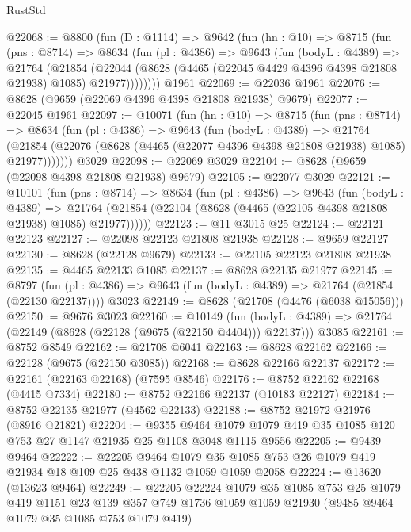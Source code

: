 \begin{lexlean}{RustStd}
\begin{coremodule}
@22068 := @8800
    (fun (D : @1114) =>
    @9642
      (fun (hn : @10) =>
      @8715
        (fun (pns : @8714) =>
        @8634
          (fun (pl : @4386) =>
          @9643
            (fun (bodyL : @4389) =>
            @21764
              (@21854
                (@22044 (@8628 (@4465 (@22045 @4429 @4396 @4398 @21808 @21938) @1085) @21977))))))))
    @1961
@22069 := @22036 @1961
@22076 := @8628 (@9659 (@22069 @4396 @4398 @21808 @21938) @9679)
@22077 := @22045 @1961
@22097 := @10071
    (fun (hn : @10) =>
    @8715
      (fun (pns : @8714) =>
      @8634
        (fun (pl : @4386) =>
        @9643
          (fun (bodyL : @4389) =>
          @21764
            (@21854 (@22076 (@8628 (@4465 (@22077 @4396 @4398 @21808 @21938) @1085) @21977)))))))
    @3029
@22098 := @22069 @3029
@22104 := @8628 (@9659 (@22098 @4398 @21808 @21938) @9679)
@22105 := @22077 @3029
@22121 := @10101
    (fun (pns : @8714) =>
    @8634
      (fun (pl : @4386) =>
      @9643
        (fun (bodyL : @4389) =>
        @21764 (@21854 (@22104 (@8628 (@4465 (@22105 @4398 @21808 @21938) @1085) @21977))))))
@22123 := @11 @3015 @25
@22124 := @22121 @22123
@22127 := @22098 @22123 @21808 @21938
@22128 := @9659 @22127
@22130 := @8628 (@22128 @9679)
@22133 := @22105 @22123 @21808 @21938
@22135 := @4465 @22133 @1085
@22137 := @8628 @22135 @21977
@22145 := @8797
    (fun (pl : @4386) => @9643 (fun (bodyL : @4389) => @21764 (@21854 (@22130 @22137))))
    @3023
@22149 := @8628 (@21708 (@4476 (@6038 @15056)))
@22150 := @9676 @3023
@22160 := @10149
    (fun (bodyL : @4389) => @21764 (@22149 (@8628 (@22128 (@9675 (@22150 @4404))) @22137)))
    @3085
@22161 := @8752 @8549
@22162 := @21708 @6041
@22163 := @8628 @22162
@22166 := @22128 (@9675 (@22150 @3085))
@22168 := @8628 @22166 @22137
@22172 := @22161 (@22163 @22168) (@7595 @8546)
@22176 := @8752 @22162 @22168 (@4415 @7334)
@22180 := @8752 @22166 @22137 (@10183 @22127)
@22184 := @8752 @22135 @21977 (@4562 @22133)
@22188 := @8752 @21972 @21976 (@8916 @21821)
@22204 := @9355
    @9464
    @1079
    @1079
    @419
    @35
    @1085
    @120
    @753
    @27
    @1147
    @21935
    @25
    @1108
    @3048
    @1115
    @9556
@22205 := @9439 @9464
@22222 := @22205
    @9464
    @1079
    @35
    @1085
    @753
    @26
    @1079
    @419
    @21934
    @18
    @109
    @25
    @438
    @1132
    @1059
    @1059
    @2058
@22224 := @13620 (@13623 @9464)
@22249 := @22205
    @22224
    @1079
    @35
    @1085
    @753
    @25
    @1079
    @419
    @1151
    @23
    @139
    @357
    @749
    @1736
    @1059
    @1059
    @21930
    (@9485 @9464 @1079 @35 @1085 @753 @1079 @419)

\end{coremodule}
\end{lexlean}
